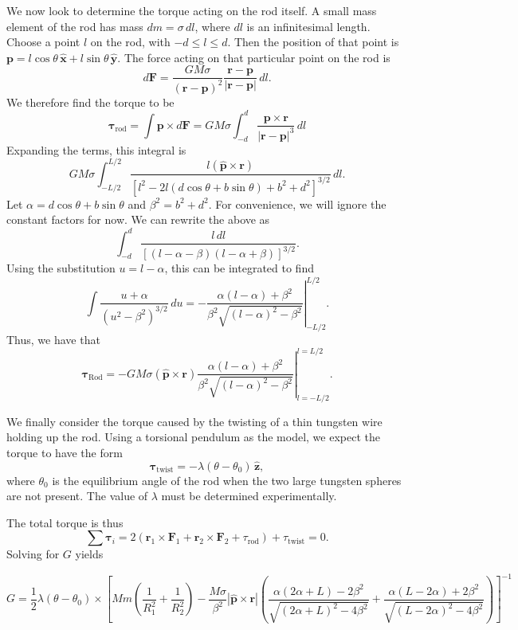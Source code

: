 \documentclass[aps, reprint,amsmath,amssymb]{revtex4-1} %
\renewcommand{\vec}[1]{\boldsymbol{#1}}
\newcommand{\uv}[1]{\vec{\hat{#1}}}
\newcommand{\x}{\vec{\hat{x}}}
\newcommand{\y}{\vec{\hat{y}}}
\newcommand{\z}{\vec{\hat{z}}}
\begin{document}
We now look to determine the torque acting on the rod itself. A small mass
element of the rod has mass $dm = \sigma\,dl$, where $dl$ is an
infinitesimal length. Choose a point $l$ on the rod, with $-d\leq l \leq
d$. Then the position of that point is $\vec{p} = l\cos\theta\,\x +
l\sin\theta\,\y$. The force acting on that particular point on the rod is
\[
    d\vec{F} = \frac{G M \sigma}{(\vec{r} - \vec{p})^2} \frac{\vec{r} -
    \vec{p}}{|\vec{r} - \vec{p}|} \, dl.
\]
We therefore find the torque to be
\begin{equation}
    \label{eq:almost_rod_torque}
    \vec{\tau}_\text{rod} = \int \vec{p} \times d\vec{F}
    = G M \sigma \int_{-d}^d \frac{\vec{p}\times\vec{r}}{|\vec{r} -
    \vec{p}|^3} \, dl
\end{equation}
Expanding the terms, this integral is
\[
    G M \sigma \int_{-L/2}^{L/2} \frac{l (\uv{p} \times \vec{r}) }
{[l^2 - 2l (d \cos \theta + b \sin \theta) + b^2 + d^2]^{3/2}}\, dl.
\]
Let $\alpha = d \cos \theta + b \sin \theta$ and $\beta^2 = b^2 + d^2$.
For convenience, we will ignore the constant factors for now. 
We can rewrite the above as
\[
    \int_{-d}^{d} \frac{l\,dl}
    {[ (l - \alpha - \beta) (l - \alpha + \beta)]^{3/2}}.
\]
Using the substitution $u = l - \alpha$, this can be integrated to
find
\[
    \int \frac{u + \alpha}{(u^2 - \beta^2)^{3/2}}\,du
    = -\left.\frac{\alpha (l-\alpha) + \beta^2}
    {\beta^2 \sqrt{(l-\alpha)^2 - \beta^2}} \right|_{-L/2}^{L/2}.
\]
Thus, we have that
\begin{equation}\label{eq:rod_torque}
    \vec{\tau}_\text{Rod} = - G M \sigma (\uv{p}\times\vec{r}) 
    \left.
    \frac{\alpha (l - \alpha) + \beta^2}
    {\beta^2 \sqrt{(l-\alpha)^2 - \beta^2}}
    \right|_{l=-L/2}^{l = L/2}.
\end{equation}

We finally consider the torque caused by the twisting of a thin tungsten
wire holding up the rod. Using a torsional pendulum as the model, we expect
the torque to have the form
\begin{equation}
    \label{eq:torsional_pendulum}
    \vec{\tau}_\text{twist} = - \lambda (\theta - \theta_0) \,\z,
\end{equation}
where $\theta_0$ is the equilibrium angle of the rod when the two large
tungsten spheres are not present. The value of $\lambda$ must be determined
experimentally. 

The total torque is thus
\[
    \sum \vec{\tau}_i = 2(\vec{r}_1 \times \vec{F}_1 + \vec{r}_2 \times
    \vec{F}_2 + \tau_\text{rod}) + \tau_\text{twist} = 0.
\]
Solving for $G$ yields
\begin{widetext}
\begin{equation}
    G = \frac{1}{2} \lambda (\theta - \theta_0)
    \times \left[
        Mm \left(\frac{1}{R_1^2} + \frac{1}{R_2^2}\right)
        - \frac{M \sigma}{\beta^2}
        |\uv{p} \times \vec{r}| 
        \left(
        \frac{\alpha  (2 \alpha +L)-2 \beta ^2}{\sqrt{(2 \alpha +L)^2-4
        \beta^2}}
        +\frac{\alpha  (L-2 \alpha ) + 2\beta^2}{\sqrt{(L-2 \alpha )^2-4
        \beta ^2}}
        \right)
    \right]^{-1}
    \label{eq:gravitational_constant}
\end{equation}
\end{widetext}
\end{document}
